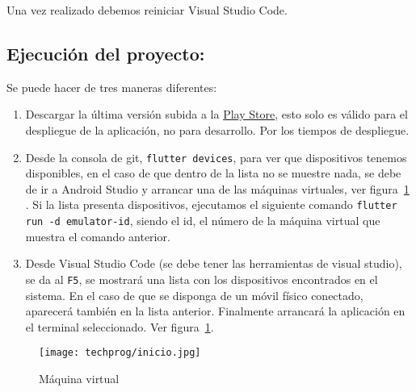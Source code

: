 Una vez realizado debemos reiniciar Visual Studio Code.

\subsection{Ejecución del proyecto:}
Se puede hacer de tres maneras diferentes:

\begin{enumerate}
	\item Descargar la última versión subida a la \href{https://play.google.com/store/apps/details?id=com.ubu.flutter_snake}{Play Store}, esto solo es válido para el despliegue de la aplicación, no para desarrollo. Por los tiempos de despliegue.

	\item Desde la consola de git, \texttt{flutter devices}, para ver que dispositivos tenemos disponibles, en el caso de que dentro de la lista no se muestre nada, se debe de ir a Android Studio y arrancar una de las máquinas virtuales, ver figura~\ref{fig:run} .
	Si la lista presenta dispositivos, ejecutamos el siguiente comando \texttt{flutter run -d emulator-id}, siendo el id, el número de la máquina virtual que muestra el comando anterior.
	
	\item Desde Visual Studio Code (se debe tener las herramientas de visual studio), se da al \texttt{F5}, se mostrará una lista con los dispositivos encontrados en el sistema. En el caso de que se disponga de un móvil físico conectado, aparecerá también en la lista anterior. Finalmente arrancará la aplicación en el terminal seleccionado. Ver figura~\ref{fig:run}.
\end{enumerate} 	

\begin{figure}%
	\centering
	\texttt{[image: techprog/inicio.jpg]}
	\caption{Máquina virtual}\label{fig:run}
\end{figure}

